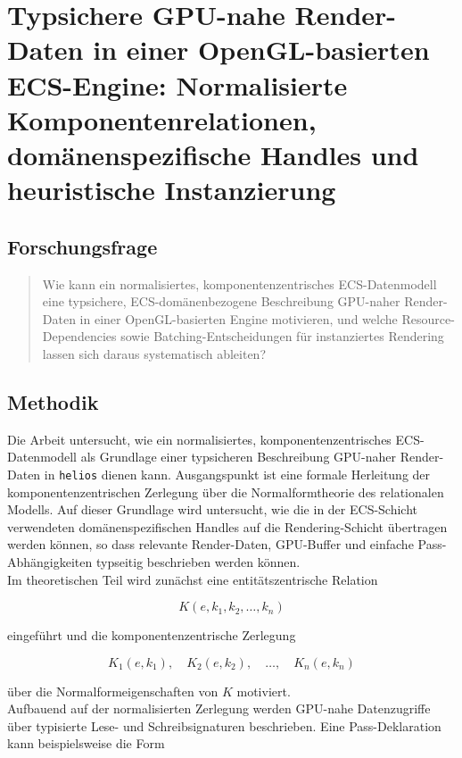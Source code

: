 \chapter{Typsichere GPU-nahe Render-Daten in einer OpenGL-basierten ECS-Engine: Normalisierte Komponentenrelationen, domänenspezifische Handles und heuristische Instanzierung}\label{ch:vorschlag3}

\section{Forschungsfrage}

\begin{quote}
    Wie kann ein normalisiertes, komponentenzentrisches ECS-Datenmodell eine typsichere, ECS-domänenbezogene Beschreibung GPU-naher Render-Daten in einer OpenGL-basierten Engine motivieren, und welche Resource-Dependencies sowie Batching-Entscheidungen für instanziertes Rendering lassen sich daraus systematisch ableiten?
\end{quote}

\section{Methodik}

Die Arbeit untersucht, wie ein normalisiertes, komponentenzentrisches ECS-Datenmodell als Grundlage einer typsicheren Beschreibung GPU-naher Render-Daten in \texttt{helios} dienen kann.
Ausgangspunkt ist eine formale Herleitung der komponentenzentrischen Zerlegung über die Normalformtheorie des relationalen Modells.
Auf dieser Grundlage wird untersucht, wie die in der ECS-Schicht verwendeten domänenspezifischen Handles auf die Rendering-Schicht übertragen werden können, so dass relevante Render-Daten, GPU-Buffer und einfache Pass-Abhängigkeiten typseitig beschrieben werden können.\\

Im theoretischen Teil wird zunächst eine entitätszentrische Relation

\[
    K(e, k_1, k_2, \ldots, k_n)
\]

\noindent
eingeführt und die komponentenzentrische Zerlegung

\[
    K_1(e, k_1),\quad K_2(e, k_2),\quad \ldots,\quad K_n(e, k_n)
\]

\noindent
über die Normalformeigenschaften von \(K\) motiviert.\\

Aufbauend auf der normalisierten Zerlegung werden GPU-nahe Datenzugriffe über typisierte Lese- und Schreibsignaturen beschrieben.
Eine Pass-Deklaration kann beispielsweise die Form

